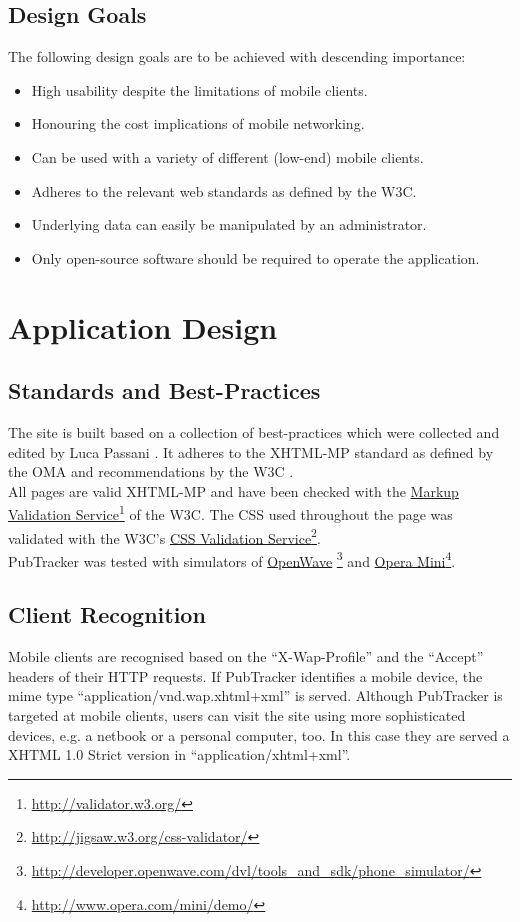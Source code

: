 \documentclass[a4paper,10pt]{scrartcl}
\begin{document}
\subsection{Design Goals}
The following design goals are to be achieved with descending importance:
\begin{itemize}
	\item High usability despite the limitations of mobile clients.
	\item Honouring the cost implications of mobile networking.
	\item Can be used with a variety of different (low-end) mobile clients.
	\item Adheres to the relevant web standards as defined by the \ac{W3C}.
	\item Underlying data can easily be manipulated by an administrator.
 	\item Only open-source software should be required to operate the application.
\end{itemize}

\section{Application Design}
\subsection{Standards and Best-Practices}
The site is built based on a collection of best-practices which were collected
and edited by Luca Passani \cite{passani}. It adheres to the \ac{XHTML-MP}
standard as defined by  the \ac{OMA} and recommendations by the \ac{W3C}
\cite{oma:standard, w3c:recommendations}.\\
All pages are valid \ac{XHTML-MP} and have been checked with the
\href{http://validator.w3.org/}{Markup Validation
Service}\footnote{\url{http://validator.w3.org/}} of the \ac{W3C}. The \ac{CSS}
used throughout the page was validated with the \ac{W3C}'s \href{http://jigsaw.w3.org/css-validator/}{CSS Validation
Service}\footnote{\url{http://jigsaw.w3.org/css-validator/}}.\\
PubTracker was tested with simulators of
\href{http://developer.openwave.com/dvl/tools_and_sdk/phone_simulator/}{OpenWave}%
\footnote{\url{http://developer.openwave.com/dvl/tools_and_sdk/phone_simulator/}}
and \href{http://www.opera.com/mini/demo/}{Opera
Mini}\footnote{\url{http://www.opera.com/mini/demo/}}.

\subsection{Client Recognition}
Mobile clients are recognised based on the ``X-Wap-Profile'' and the ``Accept''
headers of their \ac{HTTP} requests. If PubTracker identifies a mobile
device, the mime type ``application/vnd.wap.xhtml+xml'' is served. Although
PubTracker is targeted at mobile clients, users can visit the site using more
sophisticated devices, e.g. a netbook or a personal computer, too. In this case
they are served a \ac{XHTML} 1.0 Strict version in ``application/xhtml+xml''.
\end{document}
